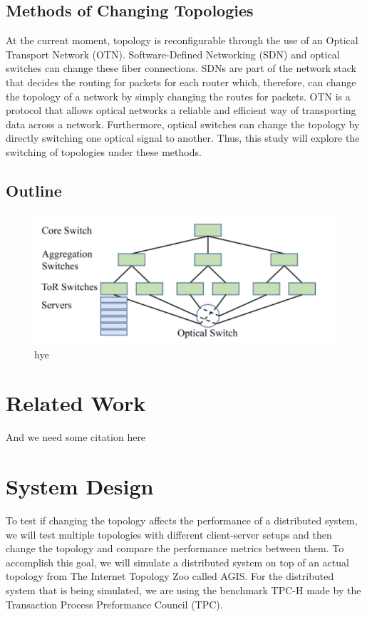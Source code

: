 \subsection{Methods of Changing Topologies}

\indent At the current moment, topology is reconfigurable through the use of an Optical Transport Network (OTN). Software-Defined Networking (SDN) and optical switches can change these fiber connections. SDNs are part of the network stack that decides the routing for packets for each router which, therefore, can change the topology of a network by simply changing the routes for packets. OTN is a protocol that allows optical networks a reliable and efficient way of transporting data across a network. Furthermore, optical switches can change the topology by directly switching one optical signal to another. Thus, this study will explore the switching of topologies under these methods.

\subsection{Outline}



\begin{figure}[tp]
\centering
\includegraphics[width=0.5 \textwidth]{figures/switches}
\caption{hye}
\end{figure}

\section{Related Work}

And we need some citation here\cite{floyd1993random, stoica2001chord}


\section{System Design}

\indent To test if changing the topology affects the performance of a distributed system, we will test multiple topologies with different client-server setups and then change the topology and compare the performance metrics between them. To accomplish this goal, we will simulate a distributed system on top of an actual topology from The Internet Topology Zoo called AGIS. For the distributed system that is being simulated, we are using the benchmark TPC-H made by the Transaction Process Preformance Council (TPC).

